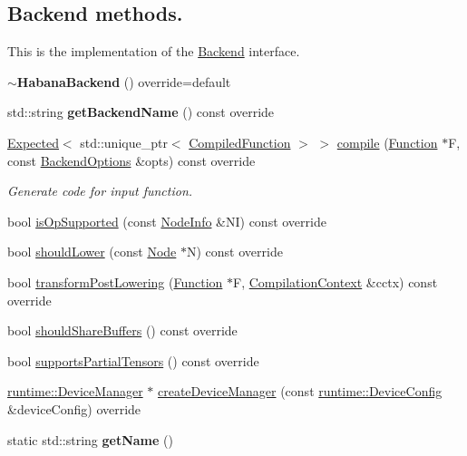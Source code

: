 \subsection*{Backend methods.}
\label{_amgrp74a5605ee0c2530d0af87631bd615b01}%
 This is the implementation of the \hyperlink{classglow_1_1_backend}{Backend} interface. \begin{DoxyCompactItemize}
\item 
\mbox{\label{classglow_1_1_habana_backend_acb7f83baf6049e9166754554db9d6d33}} 
{\bfseries $\sim$\+Habana\+Backend} () override=default
\item 
\mbox{\label{classglow_1_1_habana_backend_afbb0d258d966c7a3f2149f026b3afb5d}} 
std\+::string {\bfseries get\+Backend\+Name} () const override
\item 
\hyperlink{classglow_1_1detail_1_1_glow_expected}{Expected}$<$ std\+::unique\+\_\+ptr$<$ \hyperlink{classglow_1_1_compiled_function}{Compiled\+Function} $>$ $>$ \hyperlink{classglow_1_1_habana_backend_a0dfa74ae240460b996248124ad726690}{compile} (\hyperlink{classglow_1_1_function}{Function} $\ast$F, const \hyperlink{structglow_1_1_backend_options}{Backend\+Options} \&opts) const override
\begin{DoxyCompactList}\small\item\em Generate code for input function. \end{DoxyCompactList}\item 
bool \hyperlink{classglow_1_1_habana_backend_ac7aa767d22eeeae36d68cf84cd508aae}{is\+Op\+Supported} (const \hyperlink{classglow_1_1_node_info}{Node\+Info} \&NI) const override
\item 
bool \hyperlink{classglow_1_1_habana_backend_afb3363f26ef92e21fb1d431a1c8699df}{should\+Lower} (const \hyperlink{classglow_1_1_node}{Node} $\ast$N) const override
\item 
bool \hyperlink{classglow_1_1_habana_backend_a84fed53bd3602fd2824bcab2786c8207}{transform\+Post\+Lowering} (\hyperlink{classglow_1_1_function}{Function} $\ast$F, \hyperlink{structglow_1_1_compilation_context}{Compilation\+Context} \&cctx) const override
\item 
bool \hyperlink{classglow_1_1_habana_backend_a15199d7d7f6890963f2b8471095d0145}{should\+Share\+Buffers} () const override
\item 
bool \hyperlink{classglow_1_1_habana_backend_ac6a97ec29cff4ba43e1d459450e9d175}{supports\+Partial\+Tensors} () const override
\item 
\hyperlink{classglow_1_1runtime_1_1_device_manager}{runtime\+::\+Device\+Manager} $\ast$ \hyperlink{classglow_1_1_habana_backend_a8ae721f9f76b5ce37663348fcd8ddeeb}{create\+Device\+Manager} (const \hyperlink{structglow_1_1runtime_1_1_device_config}{runtime\+::\+Device\+Config} \&device\+Config) override
\item 
\mbox{\label{classglow_1_1_habana_backend_aca7c74daefe7ec9c57e76d6dd0989013}} 
static std\+::string {\bfseries get\+Name} ()
\end{DoxyCompactItemize}
